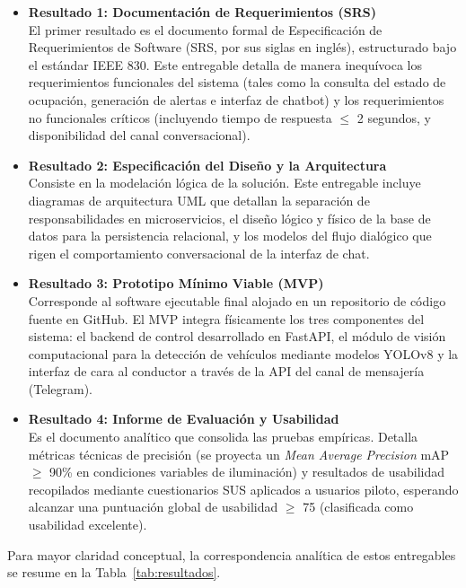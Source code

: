 \begin{itemize}
    \item \textbf{Resultado 1: Documentación de Requerimientos (SRS)} \\
    El primer resultado es el documento formal de Especificación de Requerimientos de Software (SRS, por sus siglas en inglés), estructurado bajo el estándar IEEE 830. Este entregable detalla de manera inequívoca los requerimientos funcionales del sistema (tales como la consulta del estado de ocupación, generación de alertas e interfaz de chatbot) y los requerimientos no funcionales críticos (incluyendo tiempo de respuesta $\le$ 2 segundos, y disponibilidad del canal conversacional).
    
    \item \textbf{Resultado 2: Especificación del Diseño y la Arquitectura} \\
    Consiste en la modelación lógica de la solución. Este entregable incluye diagramas de arquitectura UML que detallan la separación de responsabilidades en microservicios, el diseño lógico y físico de la base de datos para la persistencia relacional, y los modelos del flujo dialógico que rigen el comportamiento conversacional de la interfaz de chat.
    
    \item \textbf{Resultado 3: Prototipo Mínimo Viable (MVP)} \\
    Corresponde al software ejecutable final alojado en un repositorio de código fuente en GitHub. El MVP integra físicamente los tres componentes del sistema: el backend de control desarrollado en FastAPI, el módulo de visión computacional para la detección de vehículos mediante modelos YOLOv8 y la interfaz de cara al conductor a través de la API del canal de mensajería (Telegram).
    
    \item \textbf{Resultado 4: Informe de Evaluación y Usabilidad} \\
    Es el documento analítico que consolida las pruebas empíricas. Detalla métricas técnicas de precisión (se proyecta un \textit{Mean Average Precision} mAP $\ge$ 90\% en condiciones variables de iluminación) y resultados de usabilidad recopilados mediante cuestionarios SUS aplicados a usuarios piloto, esperando alcanzar una puntuación global de usabilidad $\ge$ 75 (clasificada como usabilidad excelente).
\end{itemize}

Para mayor claridad conceptual, la correspondencia analítica de estos entregables se resume en la Tabla~\ref{tab:resultados}.

